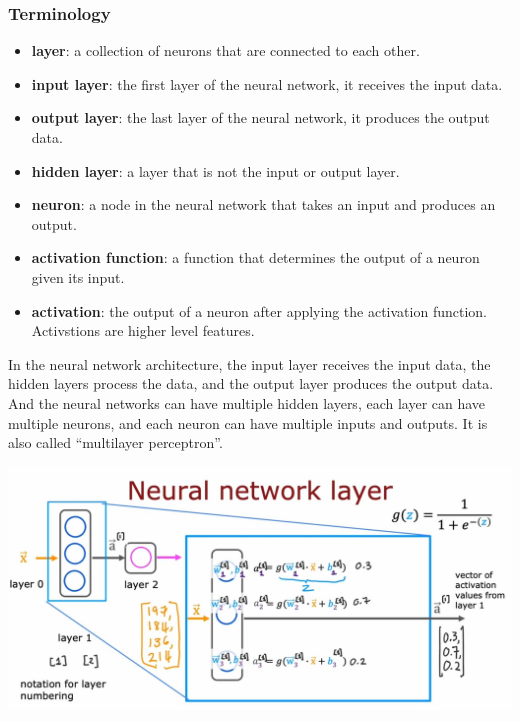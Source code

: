 \subsubsection*{Terminology}
\begin{itemize}
    \item \textbf{layer}: a collection of neurons that are connected to each other.
    \item \textbf{input layer}: the first layer of the neural network, it receives the input data.
    \item \textbf{output layer}: the last layer of the neural network, it produces the output data.
    \item \textbf{hidden layer}: a layer that is not the input or output layer.
    \item \textbf{neuron}: a node in the neural network that takes an input and produces an output.
    \item \textbf{activation function}: a function that determines the output of a neuron given its input.
    \item \textbf{activation}: the output of a neuron after applying the activation function. 
    Activstions are higher level features.
\end{itemize}

\begin{notebox}
    \hspace{2em}In the neural network architecture, the input layer receives the input data, the hidden layers process the data, and the output layer produces the output data.
    And the neural networks can have multiple hidden layers, each layer can have multiple neurons, and each neuron can have multiple inputs and outputs.
    It is also called ``multilayer perceptron''. 
\end{notebox}
\noindent
\includegraphics[width=\textwidth]{images/8.1}

